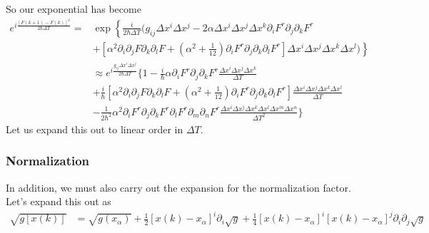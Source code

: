 So our exponential has become 
\begin{align}
e^{i\frac{[F(k+1)-F(k)]^2}{2\hbar\Delta T}}= & \exp\left\{\frac{i}{2\hbar \Delta T}\bigg(g_{ij}\Delta x^i\Delta x^j -2\alpha\Delta x^i\Delta x^j\Delta x^k\partial_iF^r \partial_j\partial_k F^r \right. \nonumber\\
& \left. + \left[\alpha^2\partial_i\partial_jF\partial_k\partial_lF +\left(\alpha^2 + \frac{1}{12}\right)\partial_iF^r\partial_j\partial_k\partial_l F^r\right]\Delta x^i\Delta x^j\Delta x^k\Delta x^l\bigg)\right\}\\
& \approx e^{i\frac{g_{ij}\Delta x^i\Delta x^j}{2\hbar\Delta T}}\bigg\{ 1  -\frac{i}{\hbar}\alpha\partial_iF^r \partial_j\partial_k F^r\frac{\Delta x^i\Delta x^j\Delta x^k}{\Delta T}  \nonumber\\
&  +\frac{i}{\hbar}\left[\alpha^2\partial_i\partial_jF\partial_k\partial_lF +\left(\alpha^2 + \frac{1}{12}\right)\partial_iF^r\partial_j\partial_k\partial_l F^r\right]\frac{\Delta x^i\Delta x^j\Delta x^k\Delta x^l}{\Delta T}\nonumber\\
& -\frac{1}{2\hbar^2} \alpha^2\partial_iF^r \partial_j\partial_k F^r\partial_lF^r \partial_m\partial_n F^r\frac{\Delta x^i\Delta x^j\Delta x^k\Delta x^l\Delta x^m\Delta x^n}{\Delta T^2}\bigg\}
\end{align}
Let us expand this out to linear order in $\Delta T$. 

\subsubsection{Normalization}
In addition, we must also carry out the expansion for the normalization factor.  
Let's expand this out as 
\begin{align}
\sqrt{g[x(k)]} & = \sqrt{g(x_\alpha)} + \frac{1}{2}[x(k)-x_\alpha]^i\partial_i \sqrt{g} + \frac{1}{4}[x(k)-x_\alpha]^i[x(k)-x_\alpha]^j\partial_i\partial_j \sqrt{g}
\end{align}

